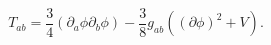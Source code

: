 \begin{equation}
T_{ab}= \frac{3}{4}\left(\partial_a\phi\partial_b\phi\right)
-\frac{3}{8}g_{ab}\left(\left(\partial\phi\right)^2+V\right).
\end{equation}

